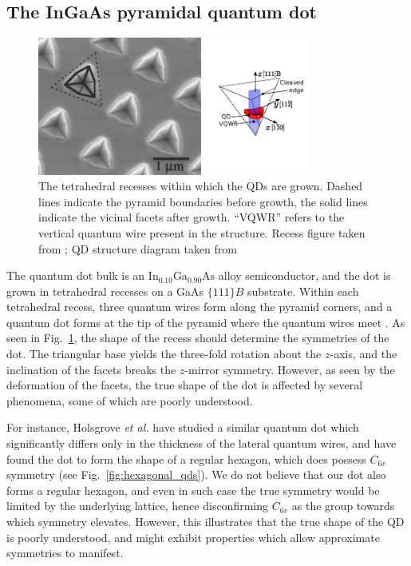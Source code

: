 \documentclass[12pt]{article}
\numberwithin{equation}{section}
\begin{document}
\subsection{The InGaAs pyramidal quantum dot} \label{sec:growth}
\begin{figure}
\begin{center}

    \includegraphics[width=0.8\textwidth]{figures/pyramidal_qds}
 \caption{The tetrahedral recesses within which the QDs are grown. Dashed lines indicate the pyramid boundaries before growth, the solid lines indicate the vicinal facets after growth. ``VQWR'' refers to the vertical quantum wire present in the structure. Recess figure taken from \cite[Fig.~1]{pyramidal_qds}; QD structure diagram taken from \cite[Fig.~1]{karlsson}\label{fig:pyramidal_qds}}
\end{center}
\end{figure}

The quantum dot bulk is an $\text{In}_{0.10}\text{Ga}_{0.90}\text{As}$ alloy semiconductor, and the dot is grown in tetrahedral recesses on a GaAs $\{111\}B$ substrate. Within each tetrahedral recess, three quantum wires form along the pyramid corners, and a quantum dot forms at the tip of the pyramid where the quantum wires meet \cite{pyramidal_qds}. As seen in Fig.~\ref{fig:pyramidal_qds}, the shape of the recess should determine the symmetries of the dot. The triangular base yields the three-fold rotation about the $z$-axis, and the inclination of the facets breaks the $z$-mirror symmetry. However, as seen by the deformation of the facets, the true shape of the dot is affected by several phenomena, some of which are poorly understood.

For instance, Holsgrove \textit{et al.} \cite{hexagon} have studied a similar quantum dot which significantly differs only in the thickness of the lateral quantum wires, and have found the dot to form the shape of a regular hexagon, which does possess $C_{6v}$ symmetry (see Fig.~\ref{fig:hexagonal_qds}). We do not believe that our dot also forms a regular hexagon, and even in such case the true symmetry would be limited by the underlying lattice, hence disconfirming $C_{6v}$ as the group towards which symmetry elevates. However, this illustrates that the true shape of the QD is poorly understood, and might exhibit properties which allow approximate symmetries to manifest.
\end{document}
